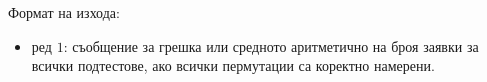 \documentclass[12pt]{article}
\begin{document}
Формат на изхода:
\begin{itemize}
	\item ред $1$: съобщение за грешка или средното аритметично на броя заявки за всички подтестове, ако всички пермутации са коректно намерени. 
\end{itemize}
\end{document}
